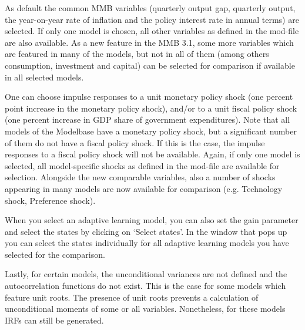 As default the common MMB variables (quarterly output gap, quarterly output, the year-on-year rate of inflation and the policy interest rate in annual terms) are selected. If only one model is chosen, all other variables as defined in the mod-file are also available. As a new feature in the MMB 3.1, some more variables which are featured in many of the models, but not in all of them  (among others consumption, investment and capital) can be selected for comparison if available in all selected models. 

One can choose impulse responses to a unit monetary policy shock (one percent point increase in the monetary policy shock), and/or to a unit fiscal policy shock (one percent increase in GDP share of government expenditures). Note that all models of the Modelbase have a monetary policy shock, but a significant number of them do not have a fiscal policy shock. If this is the case, the impulse responses to a fiscal policy shock will not be available. Again, if only one model is selected, all model-specific shocks as defined in the mod-file are available for selection. Alongside the new comparable variables, also a number of shocks  appearing in many models are now available for comparison (e.g. Technology shock, Preference shock).

When you select an adaptive learning model, you can also set the gain parameter and select the states by clicking on `Select states'. In the window that pops up you can select the states individually for all adaptive learning models you have selected for the comparison.

Lastly, for certain models, the unconditional variances are not defined and the autocorrelation functions do not exist. This is the case for some models which feature unit roots. The presence of unit roots prevents a calculation of unconditional moments of some or all variables. Nonetheless, for these models IRFs can still be generated. 



